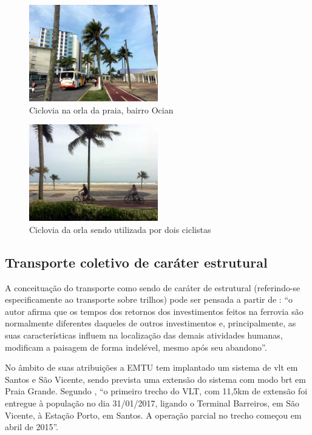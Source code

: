 	\begin{figure}[p]
		\centering
		\caption{Ciclovia na orla da praia, bairro Ocian}
		\includegraphics[width=0.5\textwidth]{img/IMG_2282.JPG}
	\end{figure}
	
	\begin{figure}[p]
		\centering
		\caption{Ciclovia da orla sendo utilizada por dois ciclistas}
		\includegraphics[width=0.5\textwidth]{img/IMG_2354.JPG}
	\end{figure}
	
	\subsection{Transporte coletivo de caráter estrutural} \label{transp_estrutural}
	
	A conceituação do transporte como sendo de caráter de estrutural (referindo-se especificamente ao transporte sobre trilhos) pode ser pensada a partir de : ``o autor afirma que os tempos dos retornos dos investimentos feitos na ferrovia são normalmente diferentes daqueles de outros investimentos e, principalmente, as suas características influem na localização das demais atividades humanas, modificam a paisagem de forma indelével, mesmo após seu abandono''.
	
	No âmbito de suas atribuições a EMTU tem implantado um sistema de \gls{vlt} em Santos e São Vicente, sendo prevista uma extensão do sistema com modo \gls{brt} em Praia Grande. Segundo , ``o  primeiro trecho do VLT, com 11,5km de extensão foi entregue à população no dia 31/01/2017, ligando o Terminal Barreiros, em São Vicente, à Estação Porto, em Santos. A operação parcial no trecho começou em abril de 2015''.
	
